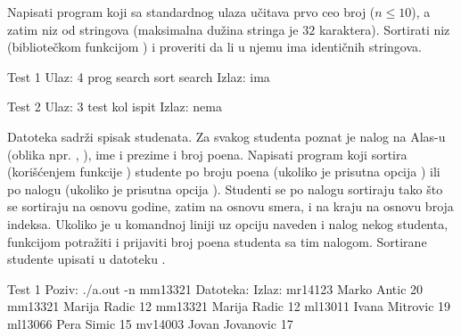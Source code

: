 \begin{Exercise}[label=522]
  Napisati program koji sa standardnog ulaza učitava prvo ceo broj
   ($n \leq 10$), a zatim niz  od  stringova
  (maksimalna dužina stringa je $32$ karaktera). Sortirati niz 
  (bibliotečkom funkcijom ) i proveriti da li u njemu ima
  identičnih stringova.
  
\begin{miditest}
\begin{test}{Test 1}
Ulaz:   4 prog search sort search
Izlaz:  ima
\end{test}
\end{miditest}
\begin{miditest}
\begin{test}{Test 2}
Ulaz:   3 test kol ispit
Izlaz:  nema
\end{test}
\end{miditest}
  
\end{Exercise}

\begin{Exercise}[label=523]
  Datoteka  sadrži spisak studenata. Za svakog
  studenta poznat je nalog na Alas-u (oblika npr. ,
  ), ime i prezime i broj poena. Napisati program koji
  sortira (korišćenjem funkcije ) studente po broju poena
  (ukoliko je prisutna opcija ) ili po nalogu (ukoliko je
  prisutna opcija ). Studenti se po nalogu sortiraju tako što
  se sortiraju na osnovu godine, zatim na osnovu smera, i na kraju na
  osnovu broja indeksa. Ukoliko je u komandnoj liniji uz opciju
   naveden i nalog nekog studenta, funkcijom 
  potražiti i prijaviti broj poena studenta sa tim nalogom. Sortirane
  studente upisati u datoteku .
  
\begin{maxitest}
\begin{test}{Test 1}
Poziv: ./a.out -n mm13321
Datoteka:                         Izlaz:
mr14123 Marko Antic 20            mm13321 Marija Radic 12
mm13321 Marija Radic 12
ml13011 Ivana Mitrovic 19
ml13066 Pera Simic 15
mv14003 Jovan Jovanovic 17
\end{test}
\end{maxitest}
  
\end{Exercise}

